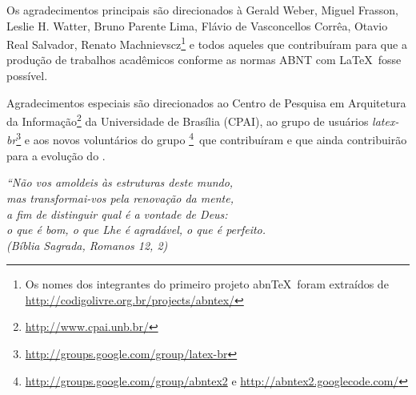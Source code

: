\documentclass[
	12pt,				%
	openright,			%
	twoside,			%
	a4paper,			%
	english,			%
	french,				%
	spanish,			%
	brazil				%
	]{abntex2}
\begin{document}
\begin{agradecimentos}
Os agradecimentos principais são direcionados à Gerald Weber, Miguel Frasson,
Leslie H. Watter, Bruno Parente Lima, Flávio de Vasconcellos Corrêa, Otavio Real
Salvador, Renato Machnievscz\footnote{Os nomes dos integrantes do primeiro
projeto abn\TeX\ foram extraídos de
\url{http://codigolivre.org.br/projects/abntex/}} e todos aqueles que
contribuíram para que a produção de trabalhos acadêmicos conforme
as normas ABNT com \LaTeX\ fosse possível.

Agradecimentos especiais são direcionados ao Centro de Pesquisa em Arquitetura
da Informação\footnote{\url{http://www.cpai.unb.br/}} da Universidade de
Brasília (CPAI), ao grupo de usuários
\emph{latex-br}\footnote{\url{http://groups.google.com/group/latex-br}} e aos
novos voluntários do grupo
\emph{\abnTeX}\footnote{\url{http://groups.google.com/group/abntex2} e
\url{http://abntex2.googlecode.com/}}~que contribuíram e que ainda
contribuirão para a evolução do \abnTeX.

\end{agradecimentos}

\begin{epigrafe}
    \vspace*{\fill}
	\begin{flushright}
		\textit{``Não vos amoldeis às estruturas deste mundo, \\
		mas transformai-vos pela renovação da mente, \\
		a fim de distinguir qual é a vontade de Deus: \\
		o que é bom, o que Lhe é agradável, o que é perfeito.\\
		(Bíblia Sagrada, Romanos 12, 2)}
	\end{flushright}
\end{epigrafe}


\end{document}
